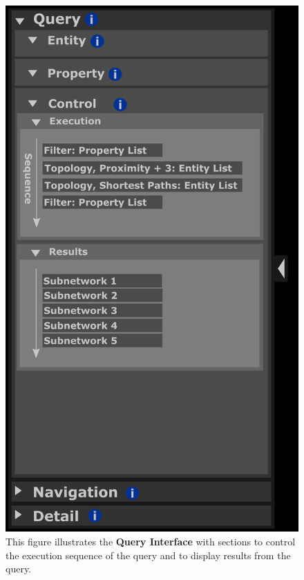 \begin{figure}[htbp]
\includegraphics[scale=1]{sketch_2017-01-02_2}
\centering
\caption{This figure illustrates the \textbf{Query Interface} with sections to control the execution sequence of the query and to display results from the query.}
\label{fig:2017-01-02_2}
\end{figure}

